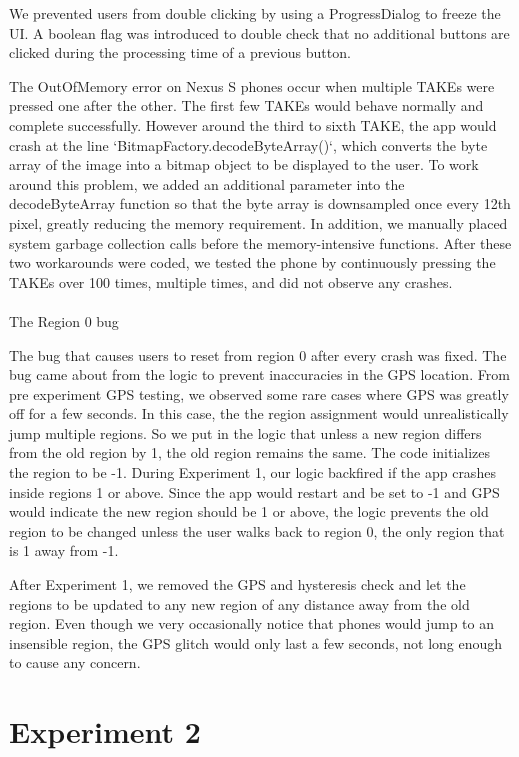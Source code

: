 We prevented users from double clicking by using a ProgressDialog to freeze the UI. A boolean flag was introduced to double check that no additional buttons are clicked during the processing time of a previous button.

The OutOfMemory error on Nexus S phones occur when multiple TAKEs were pressed one after the other. The first few TAKEs would behave normally and complete successfully. However around the third to sixth TAKE, the app would crash at the line `BitmapFactory.decodeByteArray()`, which converts the byte array of the image into a bitmap object to be displayed to the user.  To work around this problem, we added an additional parameter into the decodeByteArray function so that the byte array is downsampled once every 12th pixel, greatly reducing the memory requirement. In addition, we manually placed system garbage collection calls before the memory-intensive functions. After these two workarounds were coded, we tested the phone by continuously pressing the TAKEs over 100 times, multiple times, and did not observe any crashes.
\\
\\
The Region 0 bug

The bug that causes users to reset from region 0 after every crash was fixed. The bug came about from the logic to prevent inaccuracies in the GPS location. From pre experiment GPS testing, we observed some rare cases where GPS was greatly off for a few seconds. In this case, the the region assignment would unrealistically jump multiple regions. So we put in the logic that unless a new region differs from the old region by 1, the old region remains the same. The code initializes the region to be -1. During Experiment 1, our logic backfired if the app crashes inside regions 1 or above. Since the app would restart and be set to -1 and GPS would indicate the new region should be 1 or above, the logic prevents the old region to be changed unless the user walks back to region 0, the only region that is 1 away from -1.

After Experiment 1, we removed the GPS and hysteresis check and let the regions to be updated to any new region of any distance away from the old region. Even though we very occasionally notice that phones would jump to an insensible region, the GPS glitch would only last a few seconds, not long enough to cause any concern.

\section{Experiment 2}

